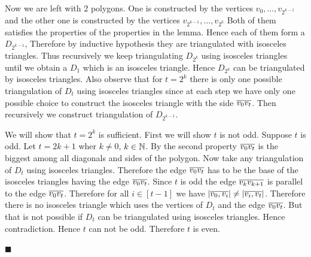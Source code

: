 \documentclass[a4paper, 11pt]{article}
\renewenvironment{proof}{\noindent{\it \textbf{Proof:}}\hspace*{1em}}{\hfill $\blacksquare$\bigskip\\}
\begin{document}
{\begin{itemize}[label=$\bullet$]
\begin{itemize}
\begin{proof}
	Now we are left with 2 polygons. One is constructed by the vertices $v_0,\dots, v_{2^{k-1}}$ and the other one is constructed by the vertices $v_{2^{k-1}}, \dots, v_{2^{k}}$ Both of them satisfies the properties of the properties in the lemma. Hence each of them form a $D_{2^{k-1}}$, Therefore by inductive hypothesis they are  triangulated with isosceles triangles. Thus recursively we keep triangulating $D_{2^k}$ using isosceles triangles until we obtain a $D_1$ which is an isosceles triangle. Hence $D_{2^k}$ can be triangulated by isosceles triangles. Also observe that for $t=2^k$ there is only one possible triangulation of $D_t$ using isosceles triangles since at each step we have only one possible choice to construct the isosceles triangle with the side $\overline{v_0v_t}$. Then recursively we construct triangulation of $D_{2^{k-1}}$.
	
	We will show that $t=2^k$ is sufficient. First we will show $t$ is not odd.  Suppose $t$ is odd. Let $t=2k+1$ wher $k\neq 0$, $k\in\mathbb{N}$. By the second property $\overline{v_0v_t}$ is the biggest among all diagonals and sides of the polygon. Now take any triangulation of $D_t$ using isosceles triangles. Therefore the edge $\overline{v_0v_t}$ has to be  the base of the isosceles triangles having the edge $\overline{v_0v_t}$. Since $t$ is odd the edge $\overline{v_{k}v_{k+1}}$ is parallel to the edge $\overline{v_0v_t}$. Therefore for all $i\in [t-1]$ we have $|\overline{v_0,v_i}|\neq |\overline{v_i,v_t}|$. Therefore there is no isosceles triangle which uses the vertices of $D_t$ and the edge $\overline{v_0v_t}$. But that is not possible if $D_t$ can be triangulated using isosceles triangles. Hence contradiction. Hence $t$ can not be odd. Therefore $t$ is even.
	

\end{proof}
\end{itemize}
\end{itemize}}
\end{document}
